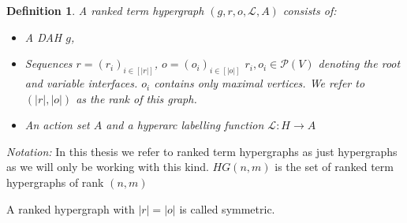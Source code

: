 \documentclass[12pt]{article}
\newtheorem{definition}{Definition}[section]
\renewcommand{\P}{\mathcal{P}}
\newcommand{\1}{\mathbbm{1}}
\renewcommand{\L}{\mathcal{L}}
\begin{document}
\begin{definition}
A \emph{ranked term hypergraph} $(g, r, o, \L, A)$ consists of:
\begin{itemize}
\item A DAH $g$,
\item Sequences $r = (r_i)_{i\in[|r|]}$, $o = (o_i)_{i\in[|o|]}$ $r_i, o_i\in \P(V)$ denoting the root and variable interfaces. $o_i$ contains only maximal vertices. We refer to $(|r|, |o|)$ as the \emph{rank} of this graph.
\item An action set $A$ and a hyperarc labelling function $\L: H\to A$
\end{itemize}
\end{definition}
\emph{Notation:} In this thesis we refer to ranked term hypergraphs as just hypergraphs as we will only be working with this kind. $HG(n,m)$ is the set of ranked term  hypergraphs of rank $(n,m)$

A ranked hypergraph with $|r| = |o|$ is called symmetric.
\end{document}

